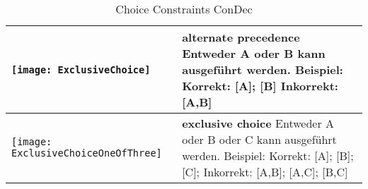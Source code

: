 \begin {table}

\begin{tabular}{|p{}|p{}|}

\hline
\begin{center}

  \texttt{[image: ExclusiveChoice]} %
    \end{center} &
\textbf{alternate precedence}\newline
  Entweder A oder B kann ausgeführt werden. \newline
  Beispiel:  Korrekt: [A]; [B] Inkorrekt: [A,B] \\
\hline
\begin{center}

  \texttt{[image: ExclusiveChoiceOneOfThree]} %
    \end{center}&
\textbf{exclusive choice} \newline
 Entweder A oder B oder C kann ausgeführt werden. \newline
  Beispiel:  Korrekt: [A]; [B]; [C]; Inkorrekt: [A,B]; [A,C]; [B,C] \\
\hline
 \end{tabular}
 \caption{Choice Constraints ConDec}
\label{tab:relation}
 \end{table}
 
 
